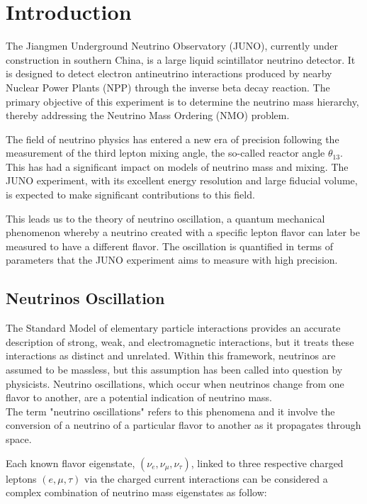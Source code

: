 \chapter{Introduction}

The Jiangmen Underground Neutrino Observatory (JUNO), currently under construction in southern China, is a large liquid scintillator neutrino detector. It is designed to detect electron antineutrino interactions produced by nearby Nuclear Power Plants (NPP) through the inverse beta decay reaction. The primary objective of this experiment is to determine the neutrino mass hierarchy, thereby addressing the Neutrino Mass Ordering (NMO) problem.

The field of neutrino physics has entered a new era of precision following the measurement of the third lepton mixing angle, the so-called reactor angle $\theta_{13}$. This has had a significant impact on models of neutrino mass and mixing. The JUNO experiment, with its excellent energy resolution and large fiducial volume, is expected to make significant contributions to this field.

This leads us to the theory of neutrino oscillation, a quantum mechanical phenomenon whereby a neutrino created with a specific lepton flavor can later be measured to have a different flavor. The oscillation is quantified in terms of parameters that the JUNO experiment aims to measure with high precision.


\section{Neutrinos Oscillation}
The Standard Model of elementary particle interactions provides an accurate description of strong, weak, and electromagnetic interactions, but it treats these interactions as distinct and unrelated. Within this framework, neutrinos are assumed to be massless, but this assumption has been called into question by physicists. Neutrino oscillations, which occur when neutrinos change from one flavor to another, are a potential indication of neutrino mass.\\
The term "neutrino oscillations" refers to this phenomena and it involve the conversion of a neutrino of a particular flavor to another as it propagates through space.

Each known flavor eigenstate, $(\nu_e,\nu_{\mu},\nu_{\tau})$, linked to three respective charged leptons $(e,\mu,\tau)$  via the charged current interactions can be considered a complex combination of neutrino mass eigenstates as follow:

